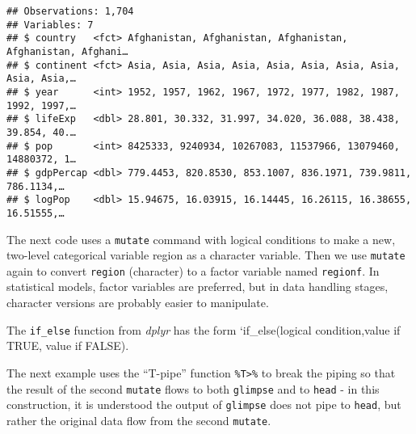\documentclass[]{book}
\newenvironment{Shaded}{\begin{snugshade}}{\end{snugshade}}
\newcommand{\KeywordTok}[1]{\textcolor[rgb]{0.13,0.29,0.53}{\textbf{#1}}}
\newcommand{\DataTypeTok}[1]{\textcolor[rgb]{0.13,0.29,0.53}{#1}}
\newcommand{\StringTok}[1]{\textcolor[rgb]{0.31,0.60,0.02}{#1}}
\newcommand{\OperatorTok}[1]{\textcolor[rgb]{0.81,0.36,0.00}{\textbf{#1}}}
\newcommand{\NormalTok}[1]{#1}
\begin{document}
\begin{verbatim}
## Observations: 1,704
## Variables: 7
## $ country   <fct> Afghanistan, Afghanistan, Afghanistan, Afghanistan, Afghani…
## $ continent <fct> Asia, Asia, Asia, Asia, Asia, Asia, Asia, Asia, Asia, Asia,…
## $ year      <int> 1952, 1957, 1962, 1967, 1972, 1977, 1982, 1987, 1992, 1997,…
## $ lifeExp   <dbl> 28.801, 30.332, 31.997, 34.020, 36.088, 38.438, 39.854, 40.…
## $ pop       <int> 8425333, 9240934, 10267083, 11537966, 13079460, 14880372, 1…
## $ gdpPercap <dbl> 779.4453, 820.8530, 853.1007, 836.1971, 739.9811, 786.1134,…
## $ logPop    <dbl> 15.94675, 16.03915, 16.14445, 16.26115, 16.38655, 16.51555,…
\end{verbatim}

The next code uses a \texttt{mutate} command with logical conditions to
make a new, two-level categorical variable region as a character
variable. Then we use \texttt{mutate} again to convert \texttt{region}
(character) to a factor variable named \texttt{regionf}. In statistical
models, factor variables are preferred, but in data handling stages,
character versions are probably easier to manipulate.

The \texttt{if\_else} function from \emph{dplyr} has the form
`if\_else(logical condition,value if TRUE, value if FALSE).

The next example uses the ``T-pipe'' function
\texttt{\%T\textgreater{}\%} to break the piping so that the result of
the second \texttt{mutate} flows to both \texttt{glimpse} and to
\texttt{head} - in this construction, it is understood the output of
\texttt{glimpse} does not pipe to \texttt{head}, but rather the original
data flow from the second \texttt{mutate}.

\begin{Shaded}
\end{Shaded}
\end{document}
